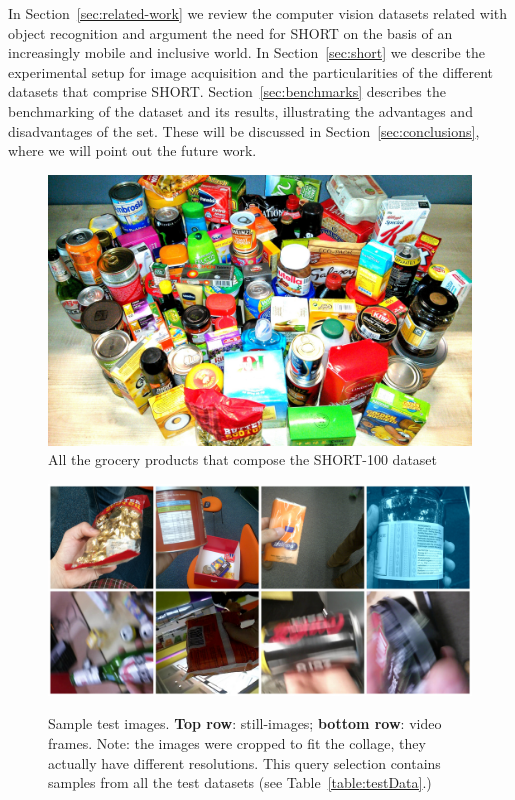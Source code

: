 In Section~\ref{sec:related-work} we review the computer vision datasets related with object recognition and argument the need for SHORT on the basis of an increasingly mobile and inclusive world. In Section~\ref{sec:short} we describe the experimental setup for image acquisition and the particularities of the different datasets that comprise SHORT. Section~\ref{sec:benchmarks} describes the benchmarking of the dataset and its results, illustrating the advantages and disadvantages of the set. These will be discussed in Section~\ref{sec:conclusions}, where we will point out the future work.

\begin{figure}[h!]
\centering
\includegraphics[width=\textwidth]{./gfx/Chapter03/SHORT_family_photo.jpg}
\caption{All the grocery products that compose the SHORT-100 dataset}
\label{fig:short-100-all}
\end{figure}


\begin{figure}
\centering
\includegraphics[width=.75\linewidth]{./gfx/Chapter03/icip-test-imgs2.jpg}\label{fig:testSetCollage}
\caption{Sample test images. \textbf{Top row}: still-images; \textbf{bottom row}: video frames. Note: the images were cropped to fit the collage, they actually have different resolutions. This query selection contains samples from all the test datasets (see Table~\ref{table:testData}.)}
\label{fig:short-30}
\end{figure}

